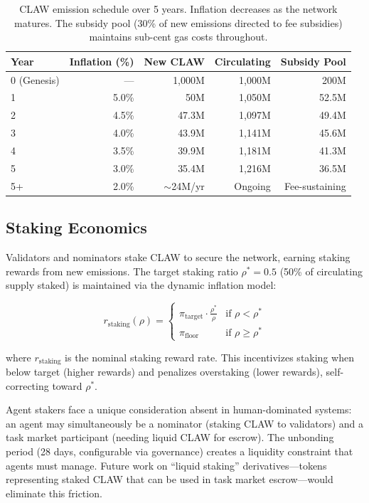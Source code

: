 \documentclass[conference]{IEEEtran}
\begin{document}
\begin{table}[t]
\centering
\small
{\setlength{\tabcolsep}{2pt}%
\begin{tabular}{lrrrr}
\toprule
\textbf{Year} & \textbf{Inflation (\%)} & \textbf{New CLAW} & \textbf{Circulating} & \textbf{Subsidy Pool} \\
\midrule
0 (Genesis) & --- & 1,000M & 1,000M & 200M \\
1 & 5.0\% & 50M & 1,050M & 52.5M \\
2 & 4.5\% & 47.3M & 1,097M & 49.4M \\
3 & 4.0\% & 43.9M & 1,141M & 45.6M \\
4 & 3.5\% & 39.9M & 1,181M & 41.3M \\
5 & 3.0\% & 35.4M & 1,216M & 36.5M \\
\midrule
5+ & 2.0\% & $\sim$24M/yr & Ongoing & Fee-sustaining \\
\bottomrule
\end{tabular}}
\caption{CLAW emission schedule over 5 years. Inflation decreases as the network matures. The subsidy pool (30\% of new emissions directed to fee subsidies) maintains sub-cent gas costs throughout.}
\label{tab:emission}
\end{table}

\subsection{Staking Economics}

Validators and nominators stake CLAW to secure the network, earning staking rewards from new emissions. The target staking ratio $\rho^* = 0.5$ (50\% of circulating supply staked) is maintained via the dynamic inflation model:

\begin{equation}
    r_{\text{staking}}(\rho) = \begin{cases}
        \pi_{\text{target}} \cdot \frac{\rho^*}{\rho} & \text{if } \rho < \rho^* \\
        \pi_{\text{floor}} & \text{if } \rho \geq \rho^*
    \end{cases}
\end{equation}

where $r_{\text{staking}}$ is the nominal staking reward rate. This incentivizes staking when below target (higher rewards) and penalizes overstaking (lower rewards), self-correcting toward $\rho^*$.

Agent stakers face a unique consideration absent in human-dominated systems: an agent may simultaneously be a nominator (staking CLAW to validators) and a task market participant (needing liquid CLAW for escrow). The unbonding period (28 days, configurable via governance) creates a liquidity constraint that agents must manage. Future work on ``liquid staking'' derivatives---tokens representing staked CLAW that can be used in task market escrow---would eliminate this friction.
\end{document}
